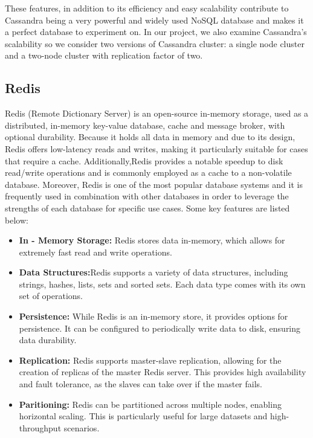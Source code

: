\documentclass[conference]{IEEEtran}
\begin{document}
These features, in addition to its efficiency and easy scalability contribute to Cassandra being a very powerful and widely used NoSQL database and makes it a perfect database to experiment on. 
In our project, we also examine Cassandra's scalability so we consider two versions of Cassandra cluster: a single node cluster and a two-node cluster with replication factor of two.

\subsection{Redis}

Redis (Remote Dictionary Server) is an open-source in-memory storage, used as a distributed, in-memory key-value database, cache and message broker, with optional durability. Because it holds all
data in memory and due to its design, Redis offers low-latency reads and writes, making it particularly suitable for cases that require a cache. Additionally,Redis provides a notable speedup to disk
read/write operations and is commonly employed as a cache to a non-volatile database. Moreover, Redis is one of the most popular database systems and
it is frequently used in combination with other databases in order to leverage the strengths of each database for specific use cases. Some key features are listed below:

\begin{itemize}
    \item \textbf{In - Memory Storage:} Redis stores data in-memory, which allows for extremely fast read and write operations.
    \item \textbf{Data Structures:}Redis supports a variety of data structures, including strings, hashes, lists, sets and sorted sets. Each data type comes with its own set of operations.
    \item \textbf{Persistence:} While Redis is an in-memory store, it provides options for persistence. It can be configured to periodically write data to disk, ensuring data durability.
    \item \textbf{Replication:} Redis supports master-slave replication, allowing for the creation of replicas of the master Redis server. 
    This provides high availability and fault tolerance, as the slaves can take over if the master fails.
    \item \textbf{Paritioning:} Redis can be partitioned across multiple nodes, enabling horizontal scaling. This is particularly useful for large datasets and high-throughput scenarios.
\end{itemize}
\end{document}
